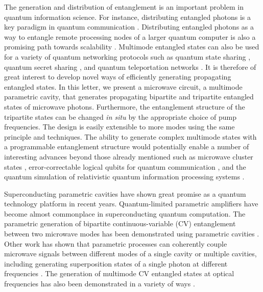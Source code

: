 \documentclass[prl,10pt,twocolumn,superscriptaddress,notitlepage,floatfix,amssymb]{revtex4}
\begin{document}
\date{\today}


\maketitle

The generation and distribution of entanglement is an important problem in quantum information science. For instance, distributing entangled photons is a key paradigm in quantum communication \cite{Jennewein:2000ke}.  Distributing entangled photons as a way to entangle remote processing nodes of a larger quantum computer is also a promising path towards scalability \cite{Kimble:2008if,Felicetti:2014dz}. Multimode entangled states can also be used for a variety of quantum networking protocols such as quantum state sharing \cite{Lance:2004do}, quantum secret sharing \cite{Cleve:1999cb,Tyc:2002cf}, and quantum teleportation networks \cite{Yonezawa:2004wm}. It is therefore of great interest to develop novel ways of efficiently generating propagating entangled states. In this letter, we present a microwave circuit, a multimode parametric cavity, that generates propagating bipartite and tripartite entangled states of microwave photons. Furthermore, the entanglement structure of the tripartite states can be changed \textit{in situ} by the appropriate choice of pump frequencies.  The design is easily extensible to more modes using the same principle and techniques.  The ability to generate complex multimode states with a programmable entanglement structure would potentially enable a number of interesting advances beyond those already mentioned such as microwave cluster states \cite{Bruschi:2016hu}, error-correctable logical qubits for quantum communication \cite{Bolt:2016cv,Jouguet:2013df}, and the quantum simulation of relativistic quantum information processing systems \cite{Bruschi:2013cq, Wilson:2011ir}. 

Superconducting parametric cavities have shown great promise as a quantum technology platform in recent years. Quantum-limited parametric amplifiers have become almost commonplace in superconducting quantum computation. The parametric generation of bipartite continuous-variable (CV) entanglement between two microwave modes has been demonstrated using parametric cavities \cite{Flurin:2012hq,Flurin:2015jf,Fedorov:2016kp,Fedorov:2017tk}. Other work has shown that parametric processes can coherently couple microwave signals between different modes of a single cavity or multiple cavities, including generating superposition states of a single photon at different frequencies \cite{Sirois:2015gr,ZakkaBajjani:2011in}.  The generation of multimode CV entangled states at optical frequencies has also been demonstrated in a variety of ways \cite{Aoki:2003is,Yonezawa:2004wm,Lance:2004do,Pysher:2011hn,Gerke:2016hu,Shalm:2012iaa}.
\end{document}
